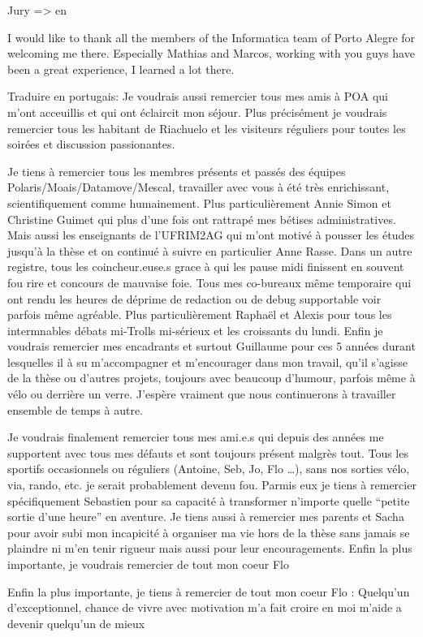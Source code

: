 
Jury => en

I would like to thank all the members of the Informatica team of Porto Alegre for welcoming me there.
Especially Mathias and Marcos, working with you guys have been a great experience, I learned a lot there.

Traduire en portugais:
Je voudrais aussi remercier tous mes amis à POA qui m'ont acceuillis et qui ont éclaircit mon séjour.
Plus précisément je voudrais remercier tous les habitant de Riachuelo et les visiteurs réguliers pour toutes les soirées et discussion passionantes.

Je tiens à remercier tous les membres présents et passés des équipes Polaris/Moais/Datamove/Mescal, travailler avec vous à été très enrichissant, scientifiquement comme humainement.
Plus particulièrement Annie Simon et Christine Guimet qui plus d'une fois ont rattrapé mes bétises administratives.
Mais aussi les enseignants de l'UFRIM2AG qui m'ont motivé à pousser les études jusqu'à la thèse et on continué à suivre en particulier Anne Rasse.
Dans un autre registre, tous les coincheur.euse.s grace à qui les pause midi finissent en souvent fou rire et concours de mauvaise foie.
Tous mes co-bureaux même temporaire qui ont rendu les heures de déprime de redaction ou de debug supportable voir parfois même agréable.
Plus particulièrement Raphaël et Alexis pour tous les intermnables débats mi-Trolls mi-sérieux et les croissants du lundi.
Enfin je voudrais remercier mes encadrants et surtout Guillaume pour ces 5 années durant lesquelles il à su m'accompagner et m'encourager dans mon travail, qu'il s'agisse de la thèse ou d'autres projets, toujours avec beaucoup d'humour, parfois même à vélo ou derrière un verre.
J'espère vraiment que nous continuerons à travailler ensemble de temps à autre.

Je voudrais finalement remercier tous mes ami.e.s qui depuis des années me supportent avec tous mes défauts et sont toujours présent malgrès tout.
Tous les sportifs occasionnels ou réguliers (Antoine, Seb, Jo, Flo \ldots), sans nos sorties vélo, via, rando, etc. je serait probablement devenu fou.
Parmis eux je tiens à remercier spécifiquement Sebastien pour sa capacité à transformer n'importe quelle “petite sortie d'une heure” en aventure.
Je tiens aussi à remercier mes parents et Sacha pour avoir subi mon incapicité à organiser ma vie hors de la thèse sans jamais se plaindre ni m'en tenir rigueur mais aussi pour leur encouragements.
Enfin la plus importante, je voudrais remercier de tout mon coeur Flo

Enfin la plus importante, je tiens à remercier de tout mon coeur Flo : 
    Quelqu'un d'exceptionnel, chance de vivre avec
    motivation
    m'a fait croire en moi
    m'aide a devenir quelqu'un de mieux


\glsresetall
